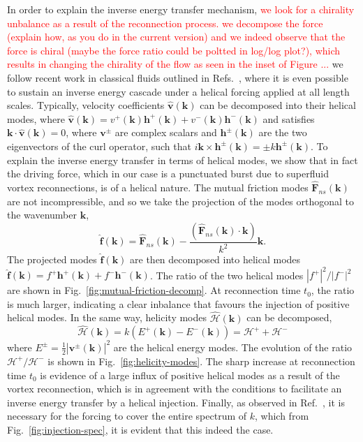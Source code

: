 \documentclass[%
 reprint,
 amsmath,amssymb,
 aps,
 prl,
]{revtex4-2}
\def \v{\mathbf{v}}
\def \k{\mathbf{k}}
\def \h{\mathbf{h}}
\def\red#1{\textcolor{red}{#1}}
\begin{document}
In order to explain the inverse energy transfer mechanism, 
\red{we look for a chirality unbalance as a result of the reconnection process. we decompose the force (explain how, as you do in the current version) and we indeed observe that the force is chiral (maybe the force ratio could be poltted in log/log plot?), which results in changing the chirality of the flow as seen in the inset of Figure ...}
we follow recent work in classical fluids outlined in Refs.~\cite{biferaleInverseEnergyCascade2012a,plunianInverseCascadeEnergy2020a}, where it is even possible to sustain an inverse energy cascade under a helical forcing applied at all length scales. Typically, velocity coefficients $\hat{\v}(\k)$ can be decomposed into their helical modes, where $\hat{\v}(\k)=v^+(\k)\h^+(\k) + v^-(\k)\h^-(\k)$ and satisfies $\k\cdot\hat{\v}(\k)=0$, where $\v^{\pm}$ are complex scalars and $\h^{\pm}(\k)$ are the two eigenvectors of the curl operator, such that $i\k\times\h^{\pm}(\k)=\pm k \h^{\pm}(\k)$. To explain the inverse energy transfer in terms of helical modes, we show that in fact the driving force, which in our case is a punctuated burst due to superfluid vortex reconnections, is of a helical nature. The mutual friction modes $\hat{\mathbf{F}}_{ns}(\k)$ are not incompressible, and so we take the projection of the modes orthogonal to the wavenumber $\k$,
\begin{equation}
    \hat{\mathbf{f}}(\k) = \hat{\mathbf{F}}_{ns}(\k) - \frac{(\hat{\mathbf{F}}_{ns}(\k)\cdot\k)}{k^2}\k.
\end{equation}
The projected modes $\hat{\mathbf{f}}(\k)$ are then decomposed into helical modes $\hat{\mathbf{f}}(\k)=f^+\h^{+}(\k) + f^-\h^{-}(\k)$. The ratio of the two helical modes $|f^+|^2/|f^-|^2$ are shown in Fig.~\ref{fig:mutual-friction-decomp}. At reconnection time $t_0$, the ratio is much larger, indicating a clear inbalance that favours the injection of positive helical modes. In the same way, helicity modes $\hat{\mathcal{H}}(\k)$ can be decomposed,
\begin{equation}
    \hat{\mathcal{H}}(\k) = k(E^+(\k) - E^-(\k)) = \mathcal{H}^+ + \mathcal{H}^-
\end{equation}
where $E^{\pm}=\frac{1}{2}|\v^{\pm}(\k)|^2$ are the helical energy modes. The evolution of the ratio $\mathcal{H}^+/\mathcal{H}^-$ is shown in Fig.~\ref{fig:helicity-modes}. The sharp increase at reconnection time $t_0$ is evidence of a large influx of positive helical modes as a result of the vortex reconnection, which is in agreement with the conditions to facilitate an inverse energy transfer by a helical injection. Finally, as observed in Ref.~\cite{plunianInverseCascadeEnergy2020a}, it is necessary for the forcing to cover the entire spectrum of $k$, which from Fig.~\ref{fig:injection-spec}, it is evident that this indeed the case.           
\end{document}
